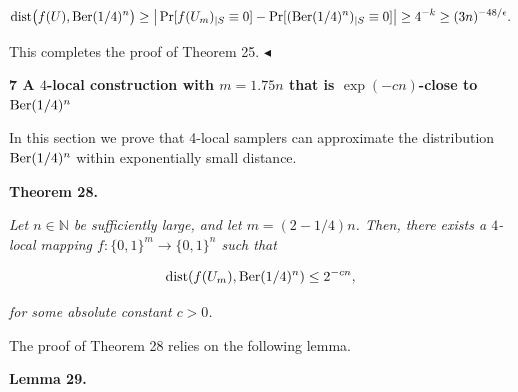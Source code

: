 \[\begin{gathered}
\mathrm{dist}\bigl(f(U),\textnormal{Ber}(1/4)^{n}\bigr)\geq\big\lvert\Pr[f(U_{m})_{|S}\equiv 0]-\Pr[(\textnormal{Ber}(1/4)^{n})_{|S}\equiv 0]\big\rvert\geq 4^{-k}\geq(3n)^{-48/\epsilon}.
\end{gathered}\]


This completes the proof of Theorem 25.
$\blacktriangleleft$\par






\par\medskip\noindent\textbf{
7 A $4$-local construction with $m=1.75n$ that is $\exp(-cn)$-close to ${\textup{{Ber}}}(1/4)^{n}$
}\par




In this section we prove that 4-local samplers can
approximate the distribution $\textnormal{Ber}(1/4)^{n}$ within exponentially small distance.\par





\par\medskip\noindent\textbf{
\textbf{Theorem 28}\textbf{.}
}\par



\emph{Let $n\in\mathbb{N}$ be sufficiently large, and let $m=(2-1/4)n$.
Then, there exists a $4$-local mapping $f\colon\{0,1\}^{m}\to\{0,1\}^{n}$ such that}\par


\[\begin{gathered}
\mathrm{dist}(f(U_{m}),\textnormal{Ber}(1/4)^{n})\leq 2^{-cn},
\end{gathered}\]


\emph{for some absolute constant $c>0$.}\par






The proof of Theorem 28 relies on the following lemma.\par





\par\medskip\noindent\textbf{
\textbf{Lemma 29}\textbf{.}
}\par



